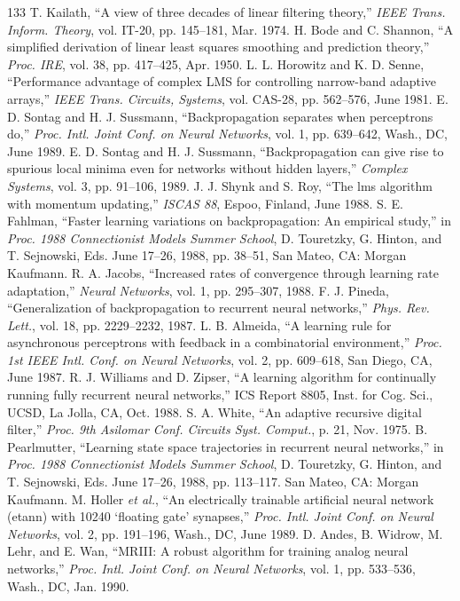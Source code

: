 \documentclass[10pt,twocolumn]{article}
\begin{document}
\begin{thebibliography}{133}
 T. Kailath, ``A view of three decades of linear filtering theory,'' \textit{IEEE Trans. Inform. Theory}, vol. IT-20, pp. 145--181, Mar. 1974.
 H. Bode and C. Shannon, ``A simplified derivation of linear least squares smoothing and prediction theory,'' \textit{Proc. IRE}, vol. 38, pp. 417--425, Apr. 1950.
 L. L. Horowitz and K. D. Senne, ``Performance advantage of complex LMS for controlling narrow-band adaptive arrays,'' \textit{IEEE Trans. Circuits, Systems}, vol. CAS-28, pp. 562--576, June 1981.
 E. D. Sontag and H. J. Sussmann, ``Backpropagation separates when perceptrons do,'' \textit{Proc. Intl. Joint Conf. on Neural Networks}, vol. 1, pp. 639--642, Wash., DC, June 1989.
 E. D. Sontag and H. J. Sussmann, ``Backpropagation can give rise to spurious local minima even for networks without hidden layers,'' \textit{Complex Systems}, vol. 3, pp. 91--106, 1989.
 J. J. Shynk and S. Roy, ``The lms algorithm with momentum updating,'' \textit{ISCAS 88}, Espoo, Finland, June 1988.
 S. E. Fahlman, ``Faster learning variations on backpropagation: An empirical study,'' in \textit{Proc. 1988 Connectionist Models Summer School}, D. Touretzky, G. Hinton, and T. Sejnowski, Eds. June 17--26, 1988, pp. 38--51, San Mateo, CA: Morgan Kaufmann.
 R. A. Jacobs, ``Increased rates of convergence through learning rate adaptation,'' \textit{Neural Networks}, vol. 1, pp. 295--307, 1988.
 F. J. Pineda, ``Generalization of backpropagation to recurrent neural networks,'' \textit{Phys. Rev. Lett.}, vol. 18, pp. 2229--2232, 1987.
 L. B. Almeida, ``A learning rule for asynchronous perceptrons with feedback in a combinatorial environment,'' \textit{Proc. 1st IEEE Intl. Conf. on Neural Networks}, vol. 2, pp. 609--618, San Diego, CA, June 1987.
 R. J. Williams and D. Zipser, ``A learning algorithm for continually running fully recurrent neural networks,'' ICS Report 8805, Inst. for Cog. Sci., UCSD, La Jolla, CA, Oct. 1988.
 S. A. White, ``An adaptive recursive digital filter,'' \textit{Proc. 9th Asilomar Conf. Circuits Syst. Comput.}, p. 21, Nov. 1975.
 B. Pearlmutter, ``Learning state space trajectories in recurrent neural networks,'' in \textit{Proc. 1988 Connectionist Models Summer School}, D. Touretzky, G. Hinton, and T. Sejnowski, Eds. June 17--26, 1988, pp. 113--117. San Mateo, CA: Morgan Kaufmann.
 M. Holler \textit{et al.}, ``An electrically trainable artificial neural network (etann) with 10240 `floating gate' synapses,'' \textit{Proc. Intl. Joint Conf. on Neural Networks}, vol. 2, pp. 191--196, Wash., DC, June 1989.
 D. Andes, B. Widrow, M. Lehr, and E. Wan, ``MRIII: A robust algorithm for training analog neural networks,'' \textit{Proc. Intl. Joint Conf. on Neural Networks}, vol. 1, pp. 533--536, Wash., DC, Jan. 1990.
\end{thebibliography}
\end{document}

